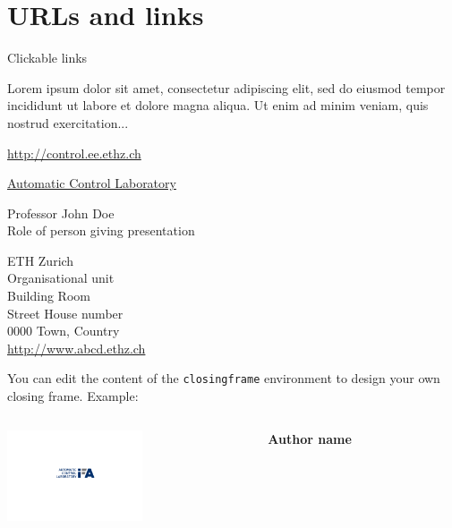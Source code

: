 \documentclass[11pt,aspectratio=169]{beamer}
\begin{document}
\section{URLs and links}

\begin{frame}{Clickable links}

	Lorem ipsum dolor sit amet, consectetur adipiscing elit, sed do eiusmod tempor incididunt ut labore et dolore magna aliqua. 
	Ut enim ad minim veniam, quis nostrud exercitation...
	
	\medskip

	\url{http://control.ee.ethz.ch}
	
	\href{http://control.ee.ethz.ch}{Automatic Control Laboratory}
	

\end{frame}

\begin{closingframe}

Professor John Doe\\
Role of person giving presentation\\

\medskip

ETH Zurich\\
Organisational unit\\
Building Room\\
Street House number\\
0000 Town, Country\\
\url{http://www.abcd.ethz.ch}

\end{closingframe}


\begin{closingframe}

	You can edit the content of the \texttt{closingframe} environment to design your own closing frame. Example:
	
	\vspace{15mm}

	\begin{columns}
		\begin{column}{0.55\textwidth}
			\raggedleft
			\includegraphics[width=40mm]{elements/ifa_logo} 
		\end{column}
		\begin{column}{0.45\textwidth}
			\textbf{Author name}\\
		\end{column}
	\end{columns}

	\vspace{20mm}
			
\end{closingframe}
\end{document}
